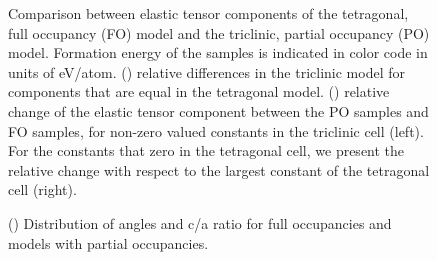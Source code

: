 \documentclass[superscriptaddress, 12pt]{revtex4-2}%
\begin{document}
\begin{figure}
  \caption{\protect\label{fig:ResultsElasticConstants} 
    Comparison between elastic tensor components of the tetragonal, full occupancy (FO) model and the triclinic,
    partial occupancy (PO) model. 
    Formation energy of the samples is indicated in color code in units of eV/atom.
    () relative differences in the triclinic model for components that are equal in the tetragonal model. 
    () relative change of the elastic tensor component between the PO samples and FO samples, for non-zero valued constants in the triclinic cell (left). 
    For the constants that zero in the tetragonal cell, we present the relative change with respect to the largest constant of the tetragonal cell (right).
  }
\end{figure}

\begin{figure}
  \caption{\protect\label{fig:SymmetryConsiderations}
    () 
    Distribution of angles and c/a ratio for full occupancies and models with partial occupancies. 
  }
\end{figure}
\end{document}
